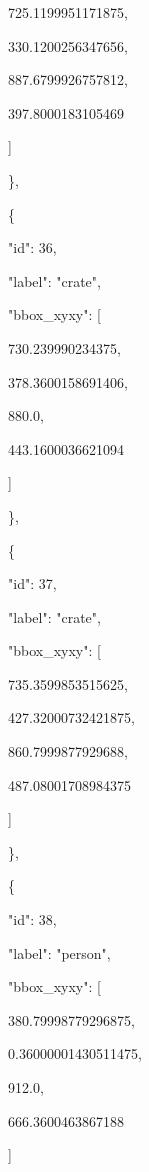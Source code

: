 \documentclass[10pt,a4paper]{article}
\begin{document}
        725.1199951171875,\allowbreak{}\par
        330.1200256347656,\allowbreak{}\par
        887.6799926757812,\allowbreak{}\par
        397.8000183105469\par
      ]\par
    \},\allowbreak{}\par
    \{\par
      "id":\allowbreak{} 36,\allowbreak{}\par
      "label":\allowbreak{} "crate",\allowbreak{}\par
      "bbox\_xyxy":\allowbreak{} [\par
        730.239990234375,\allowbreak{}\par
        378.3600158691406,\allowbreak{}\par
        880.0,\allowbreak{}\par
        443.1600036621094\par
      ]\par
    \},\allowbreak{}\par
    \{\par
      "id":\allowbreak{} 37,\allowbreak{}\par
      "label":\allowbreak{} "crate",\allowbreak{}\par
      "bbox\_xyxy":\allowbreak{} [\par
        735.3599853515625,\allowbreak{}\par
        427.32000732421875,\allowbreak{}\par
        860.7999877929688,\allowbreak{}\par
        487.08001708984375\par
      ]\par
    \},\allowbreak{}\par
    \{\par
      "id":\allowbreak{} 38,\allowbreak{}\par
      "label":\allowbreak{} "person",\allowbreak{}\par
      "bbox\_xyxy":\allowbreak{} [\par
        380.79998779296875,\allowbreak{}\par
        0.36000001430511475,\allowbreak{}\par
        912.0,\allowbreak{}\par
        666.3600463867188\par
      ]\par
\end{document}
